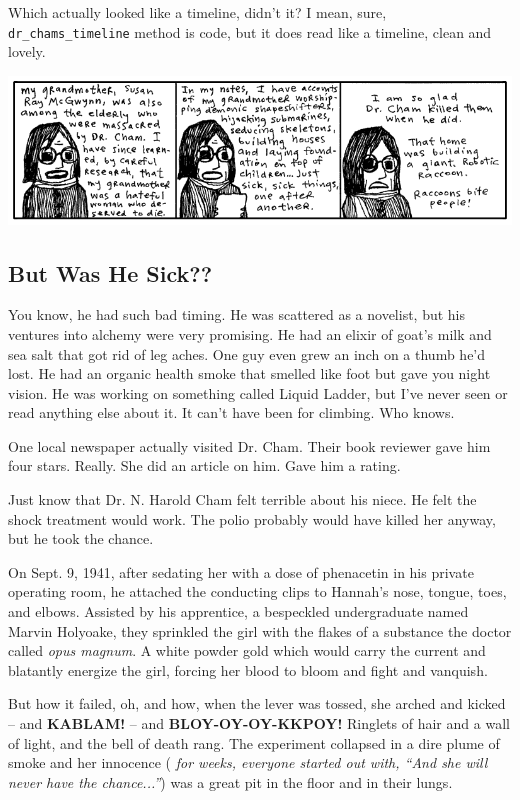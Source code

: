 \documentclass[10pt,twoside]{report}
\begin{document}
Which actually looked like a timeline, didn't it?  I mean, sure,
\lstinline[breaklines=true]|dr_chams_timeline| method is code, but it
does read like a timeline, clean and lovely.

\newpage

	\includegraphics[width=1.0\textwidth]{cache/34.png}


\subsection{But Was He Sick??}



You know, he had such bad timing.  He was scattered as a novelist, but
his ventures into alchemy were very promising.  He had an elixir of
goat's milk and sea salt that got rid of leg aches. One guy even grew
an inch on a thumb he'd lost.  He had an organic health smoke that
smelled like foot but gave you night vision.  He was working on
something called Liquid Ladder, but I've never seen or read anything
else about it.  It can't have been for climbing.  Who knows.

One local newspaper actually visited Dr. Cham.  Their book reviewer
gave him four stars. Really.  She did an article on him.  Gave him a
rating.

Just know that Dr. N. Harold Cham felt terrible about his niece.  He
felt the shock treatment would work.  The polio probably would have
killed her anyway, but he took the chance.

On Sept. 9, 1941, after sedating her with a dose of phenacetin in his
private operating room, he attached the conducting clips to Hannah's
nose, tongue, toes, and elbows.  Assisted by his apprentice, a
bespeckled undergraduate named Marvin Holyoake, they sprinkled the
girl with the flakes of a substance the doctor called {\em opus
  magnum}.  A white powder gold which would carry the current and
blatantly energize the girl, forcing her blood to bloom and fight and
vanquish.

But how it failed, oh, and how, when the lever was tossed, she arched
and kicked -- and {\bf KABLAM!} -- and {\bf BLOY-OY-OY-KKPOY!}
Ringlets of hair and a wall of light, and the bell of death rang.  The
experiment collapsed in a dire plume of smoke and her innocence ({\em
  for weeks, everyone started out with, ``And she will never have the
  chance...''}) was a great pit in the floor and in their lungs.
\end{document}
